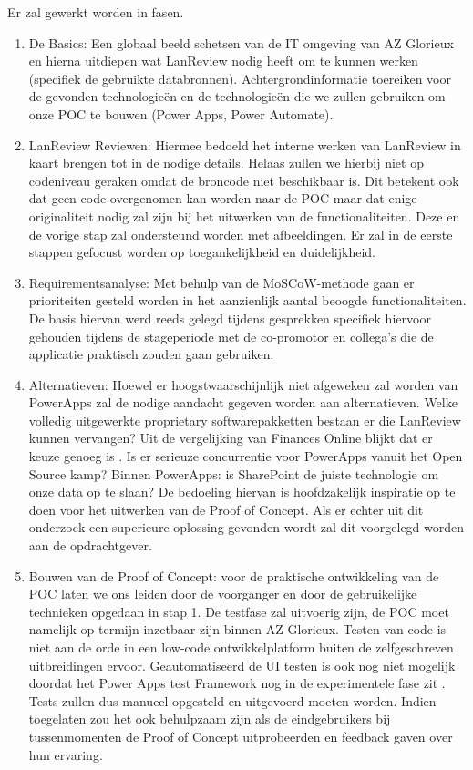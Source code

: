 Er zal gewerkt worden in fasen. 
\begin{enumerate}
    \item De Basics: Een globaal beeld schetsen van de IT omgeving van AZ Glorieux en hierna uitdiepen wat LanReview nodig heeft om te kunnen werken (specifiek de gebruikte databronnen). Achtergrondinformatie toereiken voor de gevonden technologieën en de technologieën die we zullen gebruiken om onze POC te bouwen (Power Apps, Power Automate).
    \item LanReview Reviewen: Hiermee bedoeld het interne werken van LanReview in kaart brengen tot in de nodige details. Helaas zullen we hierbij niet op codeniveau geraken omdat de broncode niet beschikbaar is. Dit betekent ook dat geen code overgenomen kan worden naar de POC maar dat enige originaliteit nodig zal zijn bij het uitwerken van de functionaliteiten. Deze en de vorige stap zal ondersteund worden met afbeeldingen. Er zal in de eerste stappen gefocust worden op toegankelijkheid en duidelijkheid.
    \item Requirementsanalyse: Met behulp van de MoSCoW-methode gaan er prioriteiten gesteld worden in het aanzienlijk aantal beoogde functionaliteiten. De basis hiervan werd reeds gelegd tijdens gesprekken specifiek hiervoor gehouden tijdens de stageperiode met de co-promotor en collega's die de applicatie praktisch zouden gaan gebruiken.
    \item Alternatieven: Hoewel er hoogstwaarschijnlijk niet afgeweken zal worden van PowerApps zal de nodige aandacht gegeven worden aan alternatieven. Welke volledig uitgewerkte proprietary softwarepakketten bestaan er die LanReview kunnen vervangen? Uit de vergelijking van Finances Online blijkt dat er keuze genoeg is \parencite{FinancesOnline2020}. Is er serieuze concurrentie voor PowerApps vanuit het Open Source kamp? Binnen PowerApps: is SharePoint de juiste technologie om onze data op te slaan? De bedoeling hiervan is hoofdzakelijk inspiratie op te doen voor het uitwerken van de Proof of Concept. Als er echter uit dit onderzoek een superieure oplossing gevonden wordt zal dit voorgelegd worden aan de opdrachtgever.
   \item Bouwen van de Proof of Concept: voor de praktische ontwikkeling van de POC laten we ons leiden door de voorganger en door de gebruikelijke technieken opgedaan in stap 1. De testfase zal uitvoerig zijn, de POC moet namelijk op termijn inzetbaar zijn binnen AZ Glorieux. Testen van code is niet aan de orde in een low-code ontwikkelplatform buiten de zelfgeschreven uitbreidingen ervoor. Geautomatiseerd de UI testen is ook nog niet mogelijk doordat het Power Apps test Framework nog in de experimentele fase zit \parencite{Microsoft2020a}. Tests zullen dus manueel opgesteld en uitgevoerd moeten worden. Indien toegelaten zou het ook behulpzaam zijn als de eindgebruikers bij tussenmomenten de Proof of Concept uitprobeerden en feedback gaven over hun ervaring.

\end{enumerate}
